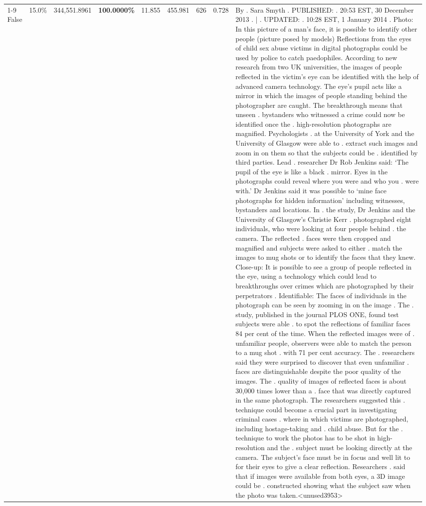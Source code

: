 \begin{table}[H]
\begin{tabular}{lllrlllll}
\cline{1-9}
False & 15.0\% & 344,551.8961 & \bfseries \color{red} 100.0000\% & 11.855 & 455.981 & 626 & 0.728 & By . Sara Smyth . PUBLISHED: . 20:53 EST, 30 December 2013 . | . UPDATED: . 10:28 EST, 1 January 2014 . Photo: In this picture of a man's face, it is possible to identify other people (picture posed by models) Reflections from the eyes of child sex abuse victims in digital photographs could be used by police to catch paedophiles. According to new research from two UK universities, the images of people reflected in the victim's eye can be identified with the help of advanced camera technology. The eye's pupil acts like a mirror in which the images of people standing behind the photographer are caught. The breakthrough means that unseen . bystanders who witnessed a crime could now be identified once the . high-resolution photographs are magnified. Psychologists . at the University of York and the University of Glasgow were able to . extract such images and zoom in on them so that the subjects could be . identified by third parties. Lead . researcher Dr Rob Jenkins said: ‘The pupil of the eye is like a black . mirror. Eyes in the photographs could reveal where you were and who you . were with.' Dr Jenkins said it was possible to ‘mine face photographs for hidden information' including witnesses, bystanders and locations. In . the study, Dr Jenkins and the University of Glasgow's Christie Kerr . photographed eight individuals, who were looking at four people behind . the camera. The reflected . faces were then cropped and magnified and subjects were asked to either . match the images to mug shots or to identify the faces that they knew. Close-up: It is possible to see a group of people reflected in the eye, using a technology which could lead to breakthroughs over crimes which are photographed by their perpetrators . Identifiable: The faces of individuals in the photograph can be seen by zooming in on the image . The . study, published in the journal PLOS ONE, found test subjects were able . to spot the reflections of familiar faces 84 per cent of the time. When the reflected images were of . unfamiliar people, observers were able to match the person to a mug shot . with 71 per cent accuracy. The . researchers said they were surprised to discover that even unfamiliar . faces are distinguishable despite the poor quality of the images. The . quality of images of reflected faces is about 30,000 times lower than a . face that was directly captured in the same photograph. The researchers suggested this . technique could become a crucial part in investigating criminal cases . where in which victims are photographed, including hostage-taking and . child abuse. But for the . technique to work the photos has to be shot in high-resolution and the . subject must be looking directly at the camera. The subject's face must be in focus and well lit to for their eyes to give a clear reflection. Researchers . said that if images were available from both eyes, a 3D image could be . constructed showing what the subject saw when the photo was taken.<unused3953> \\

\end{tabular}
\end{table}
